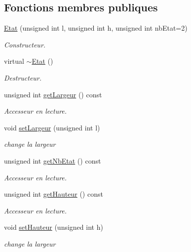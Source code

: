\subsection*{Fonctions membres publiques}
\begin{DoxyCompactItemize}
\item 
\hyperlink{class_etat_a790dce1dd20f1e800ebe59dc2a99eb29}{Etat} (unsigned int l, unsigned int h, unsigned int nb\+Etat=2)
\begin{DoxyCompactList}\small\item\em Constructeur. \end{DoxyCompactList}\item 
virtual \hyperlink{class_etat_a00bde3e769da5523e194a780ca95f7f7}{$\sim$\+Etat} ()
\begin{DoxyCompactList}\small\item\em Destructeur. \end{DoxyCompactList}\item 
unsigned int \hyperlink{class_etat_ad7822bc39dbe59ce5123bebcecb5c311}{get\+Largeur} () const 
\begin{DoxyCompactList}\small\item\em Accesseur en lecture. \end{DoxyCompactList}\item 
void \hyperlink{class_etat_a42eb8dc32d9865c25ff34f011d2c2706}{set\+Largeur} (unsigned int l)
\begin{DoxyCompactList}\small\item\em change la largeur \end{DoxyCompactList}\item 
unsigned int \hyperlink{class_etat_a9d4366197c4c39da8dd77929c4ca9621}{get\+Nb\+Etat} () const 
\begin{DoxyCompactList}\small\item\em Accesseur en lecture. \end{DoxyCompactList}\item 
unsigned int \hyperlink{class_etat_a60872a39db23fae9400ca93aed63f6c2}{get\+Hauteur} () const 
\begin{DoxyCompactList}\small\item\em Accesseur en lecture. \end{DoxyCompactList}\item 
void \hyperlink{class_etat_ae8c67cfbc0ba51fe35533791f97a7f7e}{set\+Hauteur} (unsigned int h)
\begin{DoxyCompactList}\small\item\em change la largeur \end{DoxyCompactList}\item 

\end{DoxyCompactItemize}
